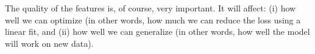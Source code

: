 \documentclass[12pt]{amsart}
\begin{document}
The quality of the features is, of course, very important.  It will affect: (i) how well we can optimize (in other words, how much we can reduce the loss using a linear fit, and (ii) how well we can generalize (in other words, how well the model will work on new data). 


%
%






%
%
%
%
%





\end{document}
